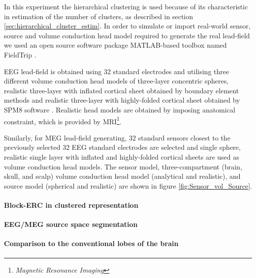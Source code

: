 In this experiment the hierarchical clustering is used because of its characteristic in estimation of the number of clusters, as described in section \ref{sec:hierarchical_cluster_estim}.
In order to simulate or import real-world sensor, source and volume conduction head model required to generate the real lead-field we used an open source software package MATLAB-based toolbox named FieldTrip \cite{Oostenveld2011}.

EEG lead-field is obtained using 32 standard electrodes and utilising three different volume conduction head models of three-layer concentric spheres, realistic three-layer with inflated cortical sheet obtained by boundary element
methods and realistic three-layer with highly-folded cortical sheet obtained by SPM8 software \cite{SPM}.
Realistic head models are obtained by imposing anatomical constraint, which is provided by MRI\footnote{\emph{Magnetic Resonance Imaging}}.

Similarly, for MEG lead-field generating, 32 standard sensors closest to the previously selected 32 EEG standard electrodes are selected and single sphere, realistic single layer with inflated and highly-folded cortical sheets are used as volume conduction head models.
The sensor model, three-compartment (brain, skull, and scalp) volume conduction head model (analytical and realistic), and source model (spherical and realistic) are shown in figure \ref{fig:Sensor_vol_Source}. 

\FloatBarrier
\paragraph{Block-ERC in clustered representation}

\paragraph{EEG/MEG source space segmentation}

\paragraph{Comparison to the conventional lobes of the brain}
